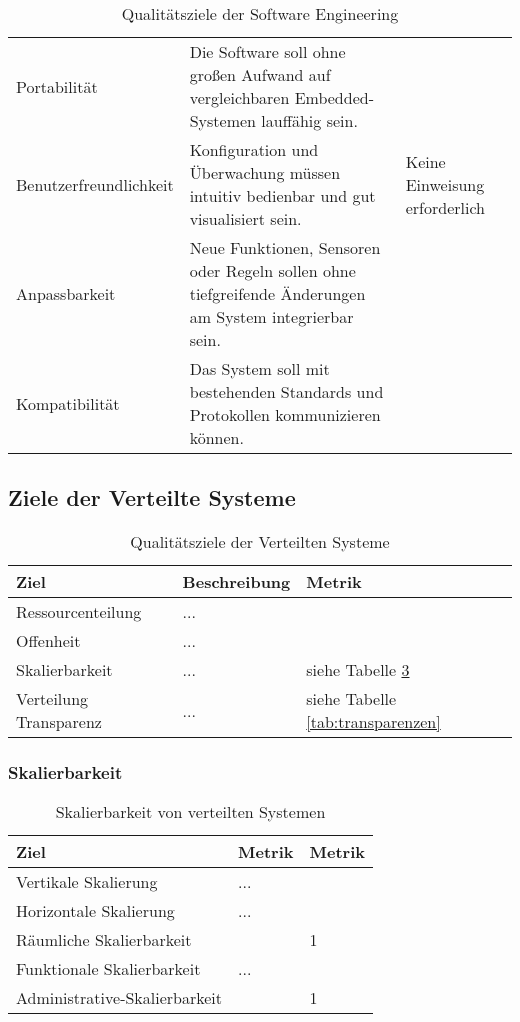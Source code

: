 \begin{table}[h!]
\begin{tabular}{p{4cm}|p{5cm}|p{5cm}|}
		& 
		\\
		\hline
		Portabilität & Die Software soll ohne großen Aufwand auf vergleichbaren Embedded-Systemen lauffähig sein. 
		& 
		\\
		\hline
		Benutzerfreundlichkeit & Konfiguration und Überwachung müssen intuitiv bedienbar und gut visualisiert sein. 
		& Keine Einweisung erforderlich
		\\
		\hline
		Anpassbarkeit & 
		Neue Funktionen, Sensoren oder Regeln sollen ohne tiefgreifende Änderungen am System integrierbar sein. 
		& 
		\\
		\hline
		Kompatibilität & 
		Das System soll mit bestehenden Standards und Protokollen kommunizieren können. 
		& 
		\\
		\hline
	\end{tabular}
	\caption{Qualitätsziele der Software Engineering}
	\label{tab:seziele}
\end{table}

\clearpage
\subsection{Ziele der Verteilte Systeme}
\begin{table}[h!]
	\centering
	\begin{tabular}{p{4cm}|p{5cm}|p{5cm}|}
		\hline
		\textbf{Ziel} & \textbf{Beschreibung} & \textbf{Metrik} \\
		\hline
		Ressourcenteilung  & ...& \\
		Offenheit & ...& \\
		Skalierbarkeit & ...& siehe Tabelle \ref{tab:skalierbarkeit} \\
		Verteilung Transparenz & ...& siehe Tabelle \ref{tab:transparenzen} \\
		\hline
	\end{tabular}
	\caption{Qualitätsziele der Verteilten Systeme}
	\label{tab:vsziele}
\end{table}

\subsubsection{Skalierbarkeit}
\begin{table}[h!]
	\centering
	\begin{tabular}{p{4cm}|p{5cm}|p{5cm}|}
		\hline
		\textbf{Ziel} & \textbf{Metrik} & \textbf{Metrik} \\
		\hline
		Vertikale Skalierung   & ... &\\
		\hline
		Horizontale Skalierung & ...& \\
		\hline
		Räumliche Skalierbarkeit &  & 1 \\
		\hline
		Funktionale Skalierbarkeit & ... & \\
		\hline
		Administrative-Skalierbarkeit & &1 \\
		\hline
	\end{tabular}
	\caption{Skalierbarkeit von verteilten Systemen}
	\label{tab:skalierbarkeit}
\end{table}


